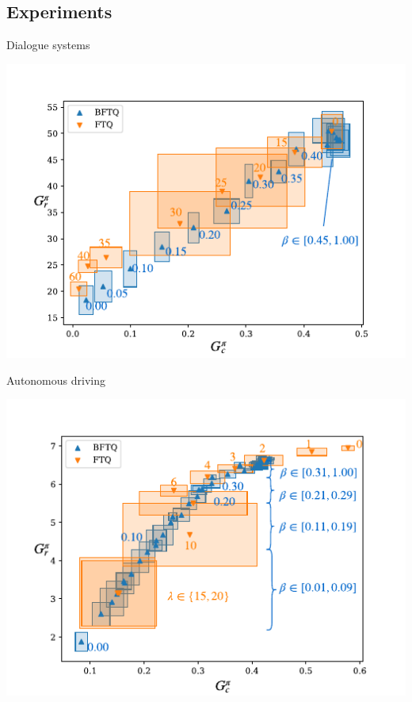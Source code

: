 \documentclass{beamer}
\begin{document}
    \subsection{Experiments}

    \begin{frame}{Dialogue systems}
        \begin{center}
            \includegraphics[scale=0.9]{img/slot-filling.pdf}
        \end{center}
    \end{frame}

    \begin{frame}{Autonomous driving}
        \begin{center}
            \includegraphics[scale=0.9]{img/highway.pdf}
        \end{center}
    \end{frame}
\end{document}
